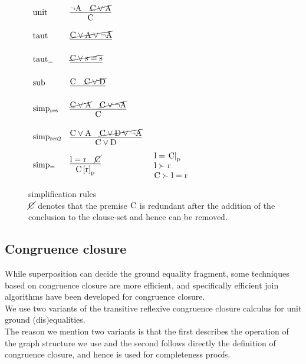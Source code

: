 \begin{figure}
$
\begin{array}[c]{llll}
\m{unit} & \vcenter{\infer[]{\m{C}                            }{\m{\lnot A}  & \cancel{\m{C \lor A}}}} & \parbox[c][1.0cm]{3cm}{}\\
\m{taut} & \vcenter{\infer[]{\m{}                             }{\cancel{\m{C \lor A \lor \lnot A}}}} & \parbox[c][1.0cm]{3cm}{}\\
\m{taut_{=}} & \vcenter{\infer[]{\m{}                             }{\cancel{\m{C \lor s=s}}}} & \parbox[c][1.0cm]{3cm}{}\\
\m{sub} & \vcenter{\infer[]  {\m{}                             }{\m{C} & \cancel{\m{C \lor D}}}} & \parbox[c][1.0cm]{3cm}{}\\
\m{simp_{res}} & \vcenter{\infer[]{\m{C}                      }{\cancel{\m{C \lor A }} & \cancel{\m{C \lor \lnot A}}}} & \parbox[c][1.2cm]{3cm}{}\\
\m{simp_{res2}} & \vcenter{\infer[]{\m{C \lor D}              }{\m{C \lor A } & \cancel{\m{C \lor D \lor \lnot A}}}} & \parbox[c][1.2cm]{3cm}{}\\
\m{simp_{=}} & \vcenter{\infer[]{\m{\termRepAt{C}{r}{p}}}{\m{l=r} & \cancel{\m{C}}}}   &
\parbox[c][1.2cm]{3cm}{\m{l=\termAt{C}{p}}\\\m{l \succ r}\\\m{C \succ l=r}}\\
\end{array}
$
\caption{simplification rules\\
$\cancel{\mathrm{C}}$ denotes that the premise $\mathrm{C}$ is redundant after the addition of the conclusion to the clause-set and hence can be removed.
}
\label{fig_superposition_simp}
\end{figure}

\subsection*{Congruence closure}
While superposition can decide the ground equality fragment, some techniques based on congruence closure are more efficient, 
and specifically efficient join algorithms have been developed for congruence closure.\\
We use two variants of the transitive reflexive congruence closure calculus  for unit ground (dis)equalities.\\
The reason we mention two variants is that the first describes the operation of the graph structure we use and the second follows directly the definition of congruence closure, and hence is used for completeness proofs.

